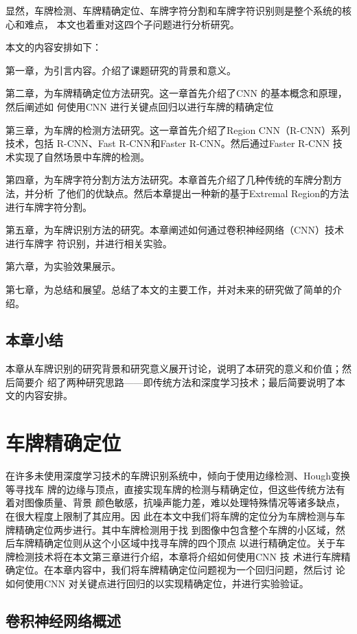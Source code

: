 显然，车牌检测、车牌精确定位、车牌字符分割和车牌字符识别则是整个系统的核心和难点，
本文也着重对这四个子问题进行分析研究。

本文的内容安排如下：

第一章，为引言内容。介绍了课题研究的背景和意义。

第二章，为车牌精确定位方法研究。这一章首先介绍了CNN 的基本概念和原理，然后阐述如
何使用CNN 进行关键点回归以进行车牌的精确定位

第三章，为车牌的检测方法研究。这一章首先介绍了Region CNN（R-CNN）系列技术，包括
R-CNN、Fast R-CNN和Faster R-CNN。然后通过Faster R-CNN 技术实现了自然场景中车牌的检测。

第四章，为车牌字符分割方法方法研究。本章首先介绍了几种传统的车牌分割方法，并分析
了他们的优缺点。然后本章提出一种新的基于Extremal Region的方法进行车牌字符分割。

第五章，为车牌识别方法的研究。本章阐述如何通过卷积神经网络（CNN）技术进行车牌字
符识别，并进行相关实验。

第六章，为实验效果展示。

第七章，为总结和展望。总结了本文的主要工作，并对未来的研究做了简单的介绍。

\section{本章小结}

本章从车牌识别的研究背景和研究意义展开讨论，说明了本研究的意义和价值；然后简要介
绍了两种研究思路——即传统方法和深度学习技术；最后简要说明了本文的内容安排。

\chapter{车牌精确定位}

在许多未使用深度学习技术的车牌识别系统中，倾向于使用边缘检测、Hough变换等寻找车
牌的边缘与顶点，直接实现车牌的检测与精确定位，但这些传统方法有着对图像质量、背景
颜色敏感，抗噪声能力差，难以处理特殊情况等诸多缺点，在很大程度上限制了其应用。因
此在本文中我们将车牌的定位分为车牌检测与车牌精确定位两步进行。其中车牌检测用于找
到图像中包含整个车牌的小区域，然后车牌精确定位则从这个小区域中找寻车牌的四个顶点
以进行精确定位。关于车牌检测技术将在本文第三章进行介绍，本章将介绍如何使用CNN 技
术进行车牌精确定位。在本章内容中，我们将车牌精确定位问题视为一个回归问题，然后讨
论如何使用CNN 对关键点进行回归的以实现精确定位，并进行实验验证。

\section{卷积神经网络概述}

